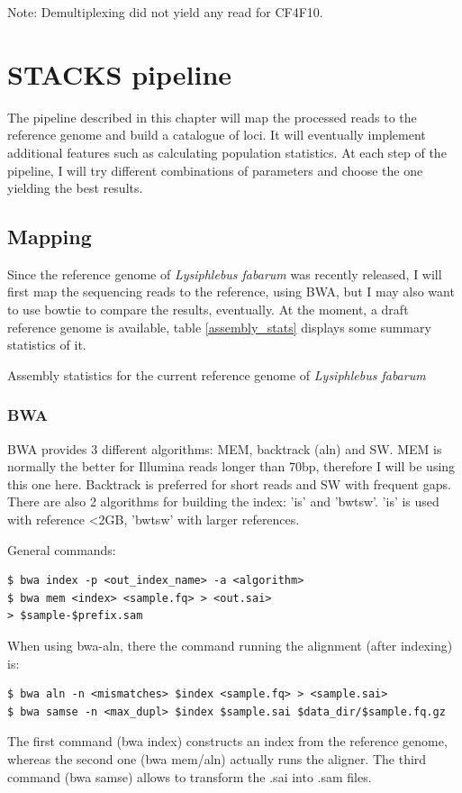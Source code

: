 \documentclass[10pt,a4paper]{report}
\begin{document}
Note: Demultiplexing did not yield any read for CF4F10. 

\chapter{STACKS pipeline}

The pipeline described in this chapter will map the processed reads to the reference genome and build a catalogue of loci. It will eventually implement additional features such as calculating population statistics. At each step of the pipeline, I will try different combinations of parameters and choose the one yielding the best results. 

\section{Mapping}
Since the reference genome of \textit{Lysiphlebus fabarum} was recently released, I will first map the sequencing reads to the reference, using BWA, but I may also want to use bowtie to compare the results, eventually. At the moment, a draft reference genome is available, table \ref{assembly_stats} displays some summary statistics of it.
\begin{table}
\vspace{10px}
\caption{Assembly statistics for the current reference genome of \textit{Lysiphlebus fabarum}}
\label{assembly_stats}
\vspace{10px}
\end{table}

\subsection{BWA}

BWA provides 3 different algorithms: MEM, backtrack (aln) and SW. MEM is normally the better for Illumina reads longer than 70bp, therefore I will be using this one here. Backtrack is preferred for short reads and SW with frequent gaps.
There are also 2 algorithms for building the index: 'is' and 'bwtsw'. 'is' is used with reference <2GB, 'bwtsw' with larger references.

General commands: 
\begin{lstlisting}
$ bwa index -p <out_index_name> -a <algorithm>
$ bwa mem <index> <sample.fq> > <out.sai>
> $sample-$prefix.sam
\end{lstlisting}

When using bwa-aln, there the command running the alignment (after indexing) is:
\begin{lstlisting}
$ bwa aln -n <mismatches> $index <sample.fq> > <sample.sai>
$ bwa samse -n <max_dupl> $index $sample.sai $data_dir/$sample.fq.gz
\end{lstlisting}
The first command (bwa index) constructs an index from the reference genome, whereas the second one (bwa mem/aln) actually runs the aligner. The third command (bwa samse) allows to transform the .sai into .sam files.
\end{document}
